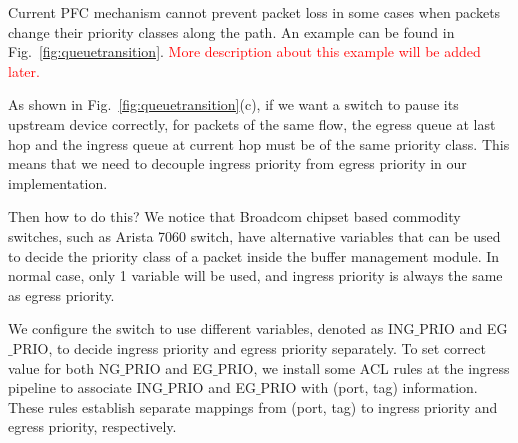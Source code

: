 Current PFC mechanism cannot prevent packet loss in some cases when packets change their priority classes along the path. An example can be found in Fig.~\ref{fig:queuetransition}.  \textcolor{red}{More description about this example will be added later.}

As shown in Fig.~\ref{fig:queuetransition}(c), if we want a switch to pause its upstream device correctly, for packets of the same flow, the egress queue at last hop and the ingress queue at current hop must be of the same priority class. This means that we need to decouple ingress priority from egress priority in our implementation. 

Then how to do this? We notice that Broadcom chipset based commodity switches, such as Arista 7060 switch, have alternative variables that can be used to decide the priority class of a packet inside the buffer management module. In normal case, only 1 variable will be used, and ingress priority is always the same as egress priority.

We configure the switch to use different variables, denoted as ING$\_$PRIO and EG$\_$PRIO, to decide ingress priority and egress priority separately.   To set correct value for both NG$\_$PRIO and EG$\_$PRIO, we install some ACL rules at the ingress pipeline to  associate ING$\_$PRIO and EG$\_$PRIO  with (port, tag) information. These rules establish separate mappings from (port, tag) to ingress priority and egress priority, respectively.





